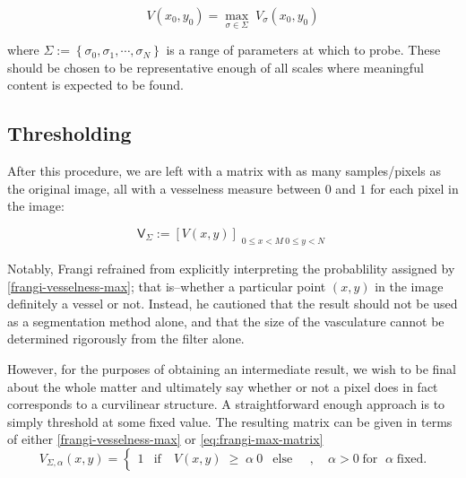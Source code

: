     \begin{equation} \label{frangi-vesselness-max}
    V(x_0, y_0) = \underset{\sigma \in \Sigma}{\max}\;  V_\sigma(x_0, y_0)
    \end{equation}
    
    where $\Sigma := \left\{ \sigma_0, \sigma_1 , \cdots, \sigma_N \right\}$ is
    a range of parameters at which to probe. These should be chosen to be representative enough of all scales where meaningful content is expected to be found.
    
    \subsection{Thresholding}
    
    After this procedure, we are left with a matrix with as many samples/pixels as the original image, all with a vesselness measure between $0$ and $1$ for each pixel in the image:
    
    \begin{equation} \label{eq:frangi-max-matrix}
    \mathsf{V}_\Sigma := \left[ V(x, y)\right]_{\substack{0\le x<M \ 0\le y<N}}
    \end{equation}
    
    Notably, Frangi \cite{frangi-paper} refrained from explicitly interpreting the probablility assigned by \cref{frangi-vesselness-max}; that is--whether a particular point $(x,y)$ in the image definitely a vessel or not. Instead, he cautioned that the result should not be used as a segmentation method alone, and that the size
    of the vasculature cannot be determined rigorously from the filter alone.
    
    However, for the purposes of obtaining an intermediate result, we wish to be final about the whole matter and ultimately say whether or not a pixel does in fact corresponds to a curvilinear structure. A straightforward enough approach is to simply threshold at some fixed value. The resulting matrix can be given in terms of either \cref{frangi-vesselness-max} or \cref{eq:frangi-max-matrix}
    \begin{equation}
    V_{\Sigma,\alpha}(x,y) = \begin{cases}
    1 & \textrm{if}\quad V(x,y) \; \ge\;  \alpha \
    0 & \textrm{else}
    \end{cases}  \quad , \quad \alpha > 0
	    \; \textrm{for } \; \alpha \;\textrm{fixed}.
    \end{equation}
    
